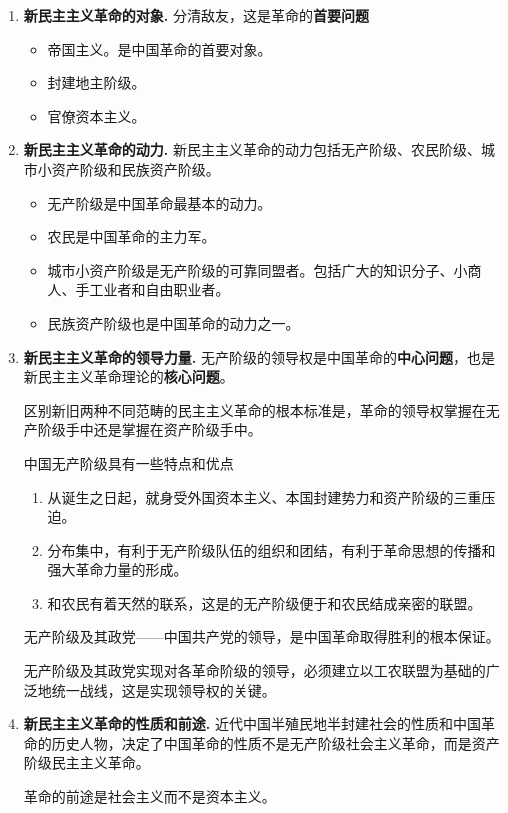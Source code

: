 \begin{enumerate}
    \item \textbf{新民主主义革命的对象.}
    分清敌友，这是革命的\textbf{首要问题}
    \begin{itemize}
        \item 帝国主义。是中国革命的首要对象。
        \item 封建地主阶级。
        \item 官僚资本主义。
    \end{itemize}
    \item \textbf{新民主主义革命的动力.}
    新民主主义革命的动力包括无产阶级、农民阶级、城市小资产阶级和民族资产阶级。
    \begin{itemize}
        \item 无产阶级是中国革命最基本的动力。
        \item 农民是中国革命的主力军。
        \item 城市小资产阶级是无产阶级的可靠同盟者。包括广大的知识分子、小商人、手工业者和自由职业者。
        \item 民族资产阶级也是中国革命的动力之一。
    \end{itemize}
    \item \textbf{新民主主义革命的领导力量.}
    无产阶级的领导权是中国革命的\textbf{中心问题}，也是新民主主义革命理论的\textbf{核心问题}。

    区别新旧两种不同范畴的民主主义革命的根本标准是，革命的领导权掌握在无产阶级手中还是掌握在资产阶级手中。

    中国无产阶级具有一些特点和优点
    \begin{enumerate}
        \item 从诞生之日起，就身受外国资本主义、本国封建势力和资产阶级的三重压迫。
        \item 分布集中，有利于无产阶级队伍的组织和团结，有利于革命思想的传播和强大革命力量的形成。
        \item 和农民有着天然的联系，这是的无产阶级便于和农民结成亲密的联盟。
    \end{enumerate}
    无产阶级及其政党——中国共产党的领导，是中国革命取得胜利的根本保证。

    无产阶级及其政党实现对各革命阶级的领导，必须建立以工农联盟为基础的广泛地统一战线，这是实现领导权的关键。

    \item \textbf{新民主主义革命的性质和前途.}
    近代中国半殖民地半封建社会的性质和中国革命的历史人物，决定了中国革命的性质不是无产阶级社会主义革命，而是资产阶级民主主义革命。

    革命的前途是社会主义而不是资本主义。
\end{enumerate}

